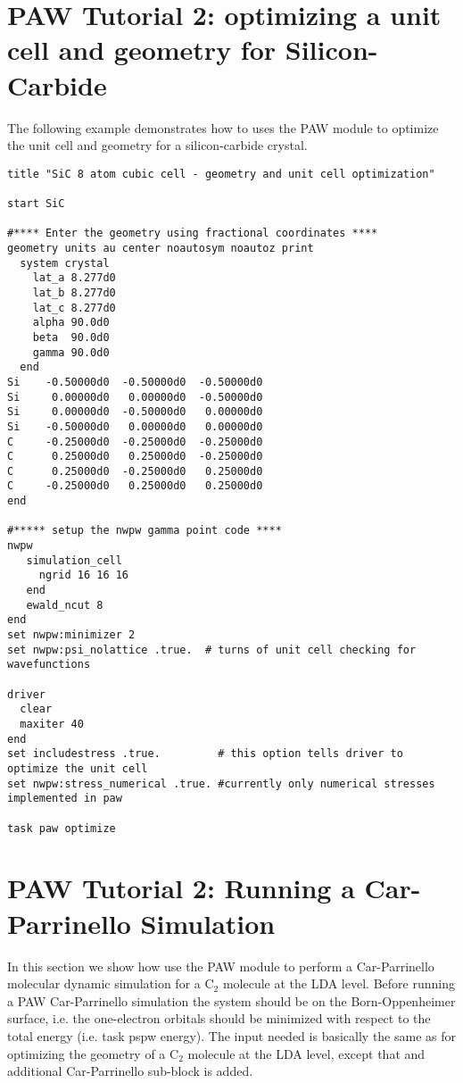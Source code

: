 \normalsize
\section{PAW Tutorial 2: optimizing a unit cell and geometry for Silicon-Carbide}
\label{sec:pspw_unitcell_optimization}

The following example demonstrates how to uses the PAW module to optimize the unit cell
and geometry for a silicon-carbide crystal.

\begin{verbatim}
title "SiC 8 atom cubic cell - geometry and unit cell optimization"

start SiC

#**** Enter the geometry using fractional coordinates ****
geometry units au center noautosym noautoz print
  system crystal
    lat_a 8.277d0
    lat_b 8.277d0
    lat_c 8.277d0
    alpha 90.0d0
    beta  90.0d0
    gamma 90.0d0
  end
Si    -0.50000d0  -0.50000d0  -0.50000d0
Si     0.00000d0   0.00000d0  -0.50000d0
Si     0.00000d0  -0.50000d0   0.00000d0
Si    -0.50000d0   0.00000d0   0.00000d0
C     -0.25000d0  -0.25000d0  -0.25000d0
C      0.25000d0   0.25000d0  -0.25000d0
C      0.25000d0  -0.25000d0   0.25000d0
C     -0.25000d0   0.25000d0   0.25000d0
end

#***** setup the nwpw gamma point code ****
nwpw
   simulation_cell
     ngrid 16 16 16
   end
   ewald_ncut 8
end
set nwpw:minimizer 2
set nwpw:psi_nolattice .true.  # turns of unit cell checking for wavefunctions

driver
  clear
  maxiter 40
end
set includestress .true.         # this option tells driver to optimize the unit cell
set nwpw:stress_numerical .true. #currently only numerical stresses implemented in paw

task paw optimize

\end{verbatim}



\normalsize
\section{PAW Tutorial 2: Running a Car-Parrinello Simulation}
\label{sec:pspw_cp}
\normalsize

In this section we show how use the PAW module to perform a Car-Parrinello
molecular dynamic simulation for a C$_2$ molecule at the LDA level.  
Before running a PAW Car-Parrinello  simulation the system should be
on the Born-Oppenheimer surface, i.e. the one-electron orbitals should be minimized 
with respect to the total energy (i.e. task pspw energy).  The input needed
is basically the same as for optimizing the geometry of a C$_2$ molecule at the LDA level,
except that and additional Car-Parrinello sub-block is added.  

